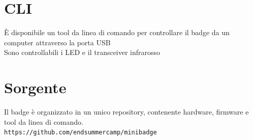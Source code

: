 \documentclass[10pt]{datasheet}
\begin{document}
\section{CLI}
È disponibile un tool da linea di comando per controllare il badge da un computer attraverso la porta USB \\
Sono controllabili i LED e il transceiver infrarosso
\section{Sorgente}
Il badge è organizzato in un unico repository, contenente hardware, firmware e tool da linea di comando.\\

\texttt{https://github.com/endsummercamp/minibadge}
	
\end{document}
